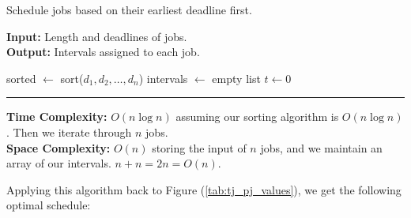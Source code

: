     \newpage 

    \begin{Func}[EarliestDeadlineFirst Algorithm - \texttt{EDF($j = 1 \dots n : t_j, d_j$)}]
        Schedule jobs based on their earliest deadline first.
    
        \vspace{.5em}
        \noindent
        \textbf{Input:} Length and deadlines of jobs.\\
        \textbf{Output:} Intervals assigned to each job.\\
        \begin{algorithm}[H]
            \SetAlgoLined
            sorted $\gets$ sort($d_1, d_2, \dots, d_n$) 
            intervals $\gets$ empty list\;
            $t \gets 0$ 
    
        \end{algorithm}

        \vspace{1em}
        \noindent\rule{\textwidth}{0.4pt}

        \noindent
        \textbf{Time Complexity:} $O(n\log n)$ assuming our sorting algorithm is $O(n\log n)$. Then we iterate through $n$ jobs.\\
        \textbf{Space Complexity:} $O(n)$ storing the input of $n$ jobs, and we maintain an array of our intervals. $n+n=2n=O(n)$.
    \end{Func}
    \noindent
    Applying this algorithm back to Figure (\ref{tab:tj_pj_values}), we get the following optimal schedule:
